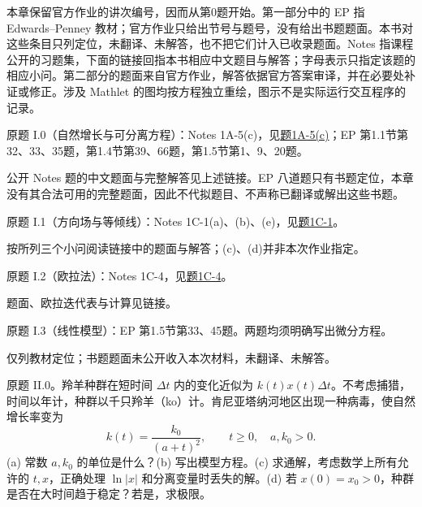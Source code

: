 \label{cw:ps1}
本章保留官方作业的讲次编号，因而从第0题开始。第一部分中的 EP 指 Edwards--Penney 教材；官方作业只给出节号与题号，没有给出书题题面。本书对这些条目只列定位，未翻译、未解答，也不把它们计入已收录题面。Notes 指课程公开的习题集，下面的链接回指本书相应中文题目与解答；字母表示只指定该题的相应小问。第二部分的题面来自官方作业，解答依据官方答案审译，并在必要处补证或修正。涉及 Mathlet 的图均按方程独立重绘，图示不是实际运行交互程序的记录。
\begin{exercise}\label{cw:ps1-I-0}
原题 I.0（自然增长与可分离方程）：Notes 1A-5(c)，见\hyperref[cw:bank-1A-5]{题1A-5(c)}；EP 第1.1节第32、33、35题，第1.4节第39、66题，第1.5节第1、9、20题。
\end{exercise}
\begin{solution}
公开 Notes 题的中文题面与完整解答见上述链接。EP 八道题只有书题定位，本章没有其合法可用的完整题面，因此不代拟题目、不声称已翻译或解出这些书题。
\end{solution}
\begin{exercise}\label{cw:ps1-I-1}
原题 I.1（方向场与等倾线）：Notes 1C-1(a)、(b)、(e)，见\hyperref[cw:bank-1C-1]{题1C-1}。
\end{exercise}
\begin{solution}按所列三个小问阅读链接中的题面与解答；(c)、(d)并非本次作业指定。\end{solution}
\begin{exercise}\label{cw:ps1-I-2}
原题 I.2（欧拉法）：Notes 1C-4，见\hyperref[cw:bank-1C-4]{题1C-4}。
\end{exercise}
\begin{solution}题面、欧拉迭代表与计算见链接。\end{solution}
\begin{exercise}\label{cw:ps1-I-3}
原题 I.3（线性模型）：EP 第1.5节第33、45题。两题均须明确写出微分方程。
\end{exercise}
\begin{solution}仅列教材定位；书题题面未公开收入本次材料，未翻译、未解答。\end{solution}
\begin{exercise}\label{cw:ps1-II-0}
原题 II.0。羚羊种群在短时间 $\Delta t$ 内的变化近似为 $k(t)x(t)\Delta t$。不考虑捕猎，时间以年计，种群以千只羚羊（ko）计。肯尼亚塔纳河地区出现一种病毒，使自然增长率变为
\[
 k(t)=\frac{k_0}{(a+t)^2},\qquad t\geq0,\quad a,k_0>0.
\]
(a) 常数 $a,k_0$ 的单位是什么？(b) 写出模型方程。(c) 求通解，考虑数学上所有允许的 $t,x$，正确处理 $\ln|x|$ 和分离变量时丢失的解。(d) 若 $x(0)=x_0>0$，种群是否在大时间趋于稳定？若是，求极限。
\end{exercise}
